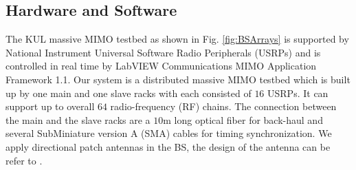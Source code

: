 \subsection{Hardware and Software}
The KUL massive MIMO testbed as shown in Fig. \ref{fig:BSArrays}  is supported by National Instrument Universal Software Radio Peripherals (USRPs) and is  controlled in real time by LabVIEW Communications MIMO Application Framework 1.1\cite{NIUSRP}. Our system is a distributed massive MIMO testbed which is built up by one main and one slave racks with each consisted of $16$ USRPs. It can support up to overall $64$ radio-frequency (RF) chains. The connection between the main and the slave racks are a $10$m long optical fiber for back-haul and several SubMiniature version A (SMA) cables for timing synchronization. We apply directional patch antennas in the BS, the design of the antenna can be refer to \cite{chen2017finite}. 


